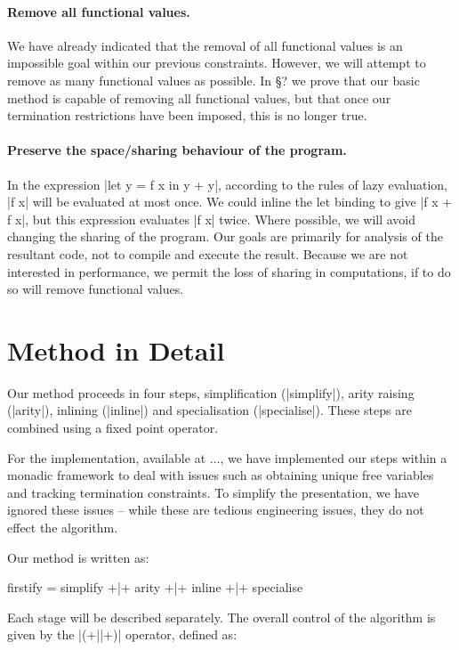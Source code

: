 \documentclass[preprint]{sigplanconf}
\begin{document}
\paragraph{Remove all functional values.} We have already indicated that the removal of all functional values is an impossible goal within our previous constraints. However, we will attempt to remove as many functional values as possible. In \S? we prove that our basic method is capable of removing all functional values, but that once our termination restrictions have been imposed, this is no longer true.

\paragraph{Preserve the space/sharing behaviour of the program.} In the expression |let y = f x in y + y|, according to the rules of lazy evaluation, |f x| will be evaluated at most once. We could inline the let binding to give |f x + f x|, but this expression evaluates |f x| twice. Where possible, we will avoid changing the sharing of the program. Our goals are primarily for analysis of the resultant code, not to compile and execute the result. Because we are not interested in performance, we permit the loss of sharing in computations, if to do so will remove functional values.

\section{Method in Detail}

Our method proceeds in four steps, simplification (|simplify|), arity raising (|arity|), inlining (|inline|) and specialisation (|specialise|). These steps are combined using a fixed point operator.

For the implementation, available at ..., we have implemented our steps within a monadic framework to deal with issues such as obtaining unique free variables and tracking termination constraints. To simplify the presentation, we have ignored these issues -- while these are tedious engineering issues, they do not effect the algorithm.

Our method is written as:

\begin{code}
firstify = simplify +|+ arity +|+ inline +|+ specialise
\end{code}

Each stage will be described separately. The overall control of the algorithm is given by the |(+||+)| operator, defined as:
\end{document}
